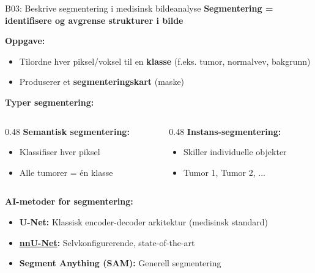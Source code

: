 \documentclass[aspectratio=169, 10pt]{beamer}
\begin{document}
\begin{frame}{B03: Beskrive segmentering i medisinsk bildeanalyse}
    \textbf{Segmentering = identifisere og avgrense strukturer i bilde}
    
    \vspace{0.3cm}
    \textbf{Oppgave:}
    \begin{itemize}
        \item Tilordne hver piksel/voksel til en \textbf{klasse} (f.eks. tumor, normalvev, bakgrunn)
        \item Produserer et \textbf{segmenteringskart} (maske)
    \end{itemize}
    
    \vspace{0.3cm}
    \textbf{Typer segmentering:}
    \begin{columns}[T]
        \begin{column}{0.48\textwidth}
            \textbf{Semantisk segmentering:}
            \begin{itemize}
                \item Klassifiser hver piksel
                \item Alle tumorer = én klasse
            \end{itemize}
        \end{column}
        \begin{column}{0.48\textwidth}
            \textbf{Instans-segmentering:}
            \begin{itemize}
                \item Skiller individuelle objekter
                \item Tumor 1, Tumor 2, ...
            \end{itemize}
        \end{column}
    \end{columns}
    
    \vspace{0.3cm}
    \textbf{AI-metoder for segmentering:}
    \begin{itemize}
        \item \textbf{U-Net:} Klassisk encoder-decoder arkitektur (medisinsk standard)
        \item \textbf{\href{https://github.com/MIC-DKFZ/nnUNet}{nnU-Net}:} Selvkonfigurerende, state-of-the-art
        \item \textbf{Segment Anything (SAM):} Generell segmentering
    \end{itemize}
\end{frame}
\end{document}
